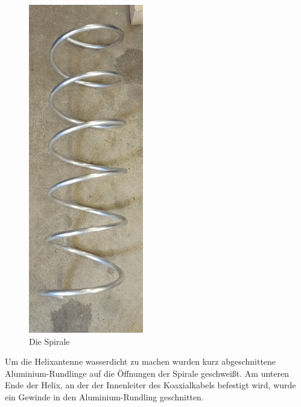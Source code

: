 \begin{figure}[h!]
	\centering
	\includegraphics[width=5cm,angle=90]{../ref/Spirale.jpg}
	\caption{Die Spirale}
	\label{fig:Spirale}
\end{figure}

Um die Helixantenne wasserdicht zu machen wurden kurz abgeschnittene Aluminium-Rundlinge auf die Öffnungen der Spirale geschweißt. Am unteren Ende der Helix, an der der Innenleiter des Koaxialkabels befestigt wird, wurde ein Gewinde in den Aluminium-Rundling geschnitten.

